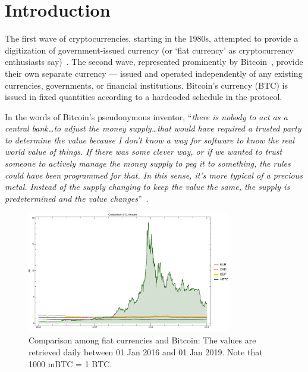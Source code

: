 
\section{Introduction}\label{sec:Intro}

The first wave of cryptocurrencies, starting in the 1980s, attempted to provide a digitization of government-issued currency (or `fiat currency' as cryptocurrency enthusiasts say)~\cite{NBFMG16}. The second wave, represented prominently by Bitcoin~\cite{nakamoto2008bitcoin}, provide their own separate currency --- issued and operated independently of any existing currencies, governments, or financial institutions. Bitcoin's currency (BTC) is issued in fixed quantities according to a hardcoded schedule in the protocol. 

In the words of Bitcoin's pseudonymous inventor, ``\textit{there is nobody to act as a central bank\ldots to adjust the money supply\ldots that would have required a trusted party to determine the value because I don’t know a way for software to know the real world value of things. If there was some clever way, or if we wanted to trust someone to actively manage the money supply to peg it to something, the rules could have been programmed for that. In this sense, it’s more typical of a precious metal. Instead of the supply changing to keep the value the same, the supply is predetermined and the value changes}''~\cite{Cha14}.

\begin{figure}[t]
	\centering
	\includegraphics[width=0.8\textwidth]{figures/allCurrencies.pdf}
	\caption{\label{fig:btcandfiat}Comparison among fiat currencies and Bitcoin: The values are retrieved daily between  01 Jan 2016 and 01 Jan 2019. Note that 1000 mBTC = 1 BTC.}
\end{figure}

